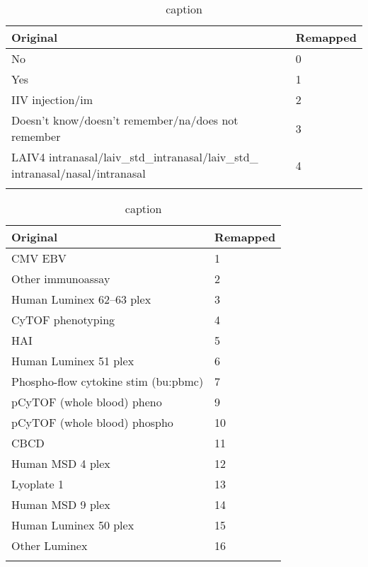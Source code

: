 \begin{appendices}
    \begin{table}[htpb]
        \begin{tabular}{ll}
            \toprule{}
            Original & Remapped \\
            \midrule{}
            No& 0 \\
            Yes& 1 \\
            IIV injection/im& 2 \\
            Doesn’t know/doesn’t remember/na/does not remember& 3 \\
            LAIV4 intranasal/laiv\_std\_intranasal/laiv\_std\_ intranasal/nasal/intranasal& 4 \\
            \bottomrule{}
        \end{tabular}
        \caption{caption}\label{tbl:remapHistory}
    \end{table}

    \begin{table}[htpb]
        \begin{tabular}{ll}
            \toprule{}
            Original & Remapped \\
            \midrule{}
            CMV EBV & 1 \\
            Other immunoassay & 2 \\
            Human Luminex 62–63 plex & 3 \\
            CyTOF phenotyping & 4 \\
            HAI & 5 \\
            Human Luminex 51 plex & 6 \\
            Phospho-flow cytokine stim (\gls{bu:pbmc}) & 7 \\
            pCyTOF (whole blood) pheno & 9 \\
            pCyTOF (whole blood) phospho & 10 \\
            CBCD & 11 \\
            Human MSD 4 plex & 12 \\
            Lyoplate 1 & 13 \\
            Human MSD 9 plex & 14 \\
            Human Luminex 50 plex & 15 \\
            Other Luminex & 16 \\
            \bottomrule{}
        \end{tabular}
        \caption{caption}\label{tbl:remapAssays}
    \end{table}
\end{appendices}


